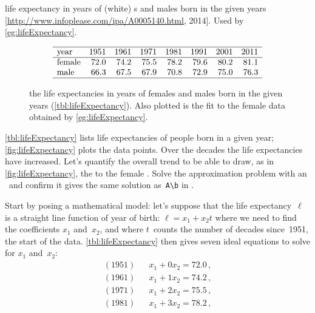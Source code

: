 \begin{example} \label{eg:lifeExpectancy}
\begin{table}
\caption{life expectancy in years of (white) s and males born in the given years  [\url{http://www.infoplease.com/ipa/A0005140.html}, 2014].  Used by \autoref{eg:lifeExpectancy}.}
\label{tbl:lifeExpectancy}
\begin{equation*}
\begin{array}{lrrrrrrrr} \hline
\text{year}&1951&1961&1971&1981&1991&2001&2011\\\hline
\text{female}&72.0&74.2&75.5&78.2&79.6&80.2&81.1\\
\text{male}&66.3&67.5&67.9&70.8&72.9&75.0&76.3\\\hline
\end{array}
\end{equation*}
\end{table}
\begin{figure}
\centering

\caption{the life expectancies in years of females and males born in the given years (\autoref{tbl:lifeExpectancy}).  
Also plotted is the  fit to the female data obtained by \autoref{eg:lifeExpectancy}.}
\label{fig:lifeExpectancy}
\end{figure}
\autoref{tbl:lifeExpectancy} lists life expectancies of people born in a given year; \autoref{fig:lifeExpectancy} plots the data points.
Over the decades the life expectancies have increased.
Let's quantify the overall trend to be able to draw, as in 
\autoref{fig:lifeExpectancy}, the  to the 
female .
Solve the approximation problem with an \svd\ and confirm it gives the same solution as~\verb|A\b| in \script.
\begin{solution} 
Start by posing a mathematical model: let's suppose that the life expectancy~\(\ell\) is a straight line function of year of birth: \(\ell=x_1+x_2t\) where we need to find the coefficients \(x_1\) and~\(x_2\), and where \(t\)~counts the number of decades since~1951, the start of the data.
\autoref{tbl:lifeExpectancy} then gives seven ideal equations to solve for \(x_1\) and~\(x_2\):
\begin{eqnarray*}
(1951)&&x_1+0x_2=72.0\,,
\\(1961)&&x_1+1x_2=74.2\,,
\\(1971)&&x_1+2x_2=75.5\,,
\\(1981)&&x_1+3x_2=78.2\,,

\end{eqnarray*}
\end{solution}
\end{example}
